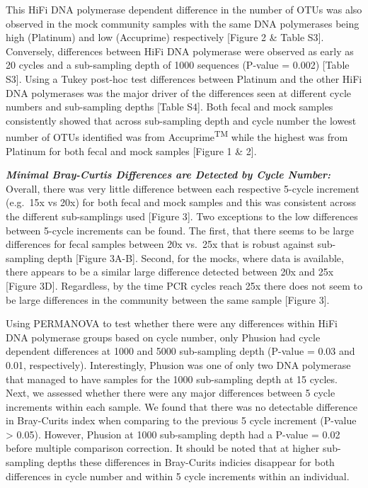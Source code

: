 \documentclass[12pt,]{article}
\begin{document}
This HiFi DNA polymerase dependent difference in the number of OTUs was
also observed in the mock community samples with the same DNA
polymerases being high (Platinum) and low (Accuprime) respectively
{[}Figure 2 \& Table S3{]}. Conversely, differences between HiFi DNA
polymerase were observed as early as 20 cycles and a sub-sampling depth
of 1000 sequences (P-value = 0.002) {[}Table S3{]}. Using a Tukey
post-hoc test differences between Platinum and the other HiFi DNA
polymerases was the major driver of the differences seen at different
cycle numbers and sub-sampling depths {[}Table S4{]}. Both fecal and
mock samples consistently showed that across sub-sampling depth and
cycle number the lowest number of OTUs identified was from
Accuprime\textsuperscript{TM} while the highest was from Platinum for
both fecal and mock samples {[}Figure 1 \& 2{]}.

\textbf{\emph{Minimal Bray-Curtis Differences are Detected by Cycle
Number:}} Overall, there was very little difference between each
respective 5-cycle increment (e.g.~15x vs 20x) for both fecal and mock
samples and this was consistent across the different sub-samplings used
{[}Figure 3{]}. Two exceptions to the low differences between 5-cycle
increments can be found. The first, that there seems to be large
differences for fecal samples between 20x vs.~25x that is robust against
sub-sampling depth {[}Figure 3A-B{]}. Second, for the mocks, where data
is available, there appears to be a similar large difference detected
between 20x and 25x {[}Figure 3D{]}. Regardless, by the time PCR cycles
reach 25x there does not seem to be large differences in the community
between the same sample {[}Figure 3{]}.

Using PERMANOVA to test whether there were any differences within HiFi
DNA polymerase groups based on cycle number, only Phusion had cycle
dependent differences at 1000 and 5000 sub-sampling depth (P-value =
0.03 and 0.01, respectively). Interestingly, Phusion was one of only two
DNA polymerase that managed to have samples for the 1000 sub-sampling
depth at 15 cycles. Next, we assessed whether there were any major
differences between 5 cycle increments within each sample. We found that
there was no detectable difference in Bray-Curits index when comparing
to the previous 5 cycle increment (P-value \textgreater{} 0.05).
However, Phusion at 1000 sub-sampling depth had a P-value = 0.02 before
multiple comparison correction. It should be noted that at higher
sub-sampling depths these differences in Bray-Curits indicies disappear
for both differences in cycle number and within 5 cycle increments
within an individual.
\end{document}
